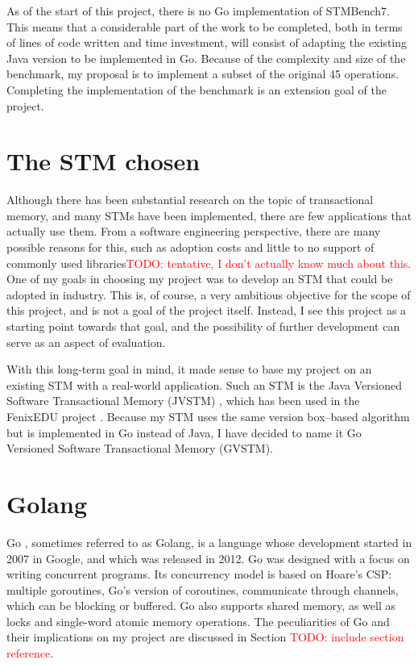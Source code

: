 \documentclass[12pt,a4paper,twoside,openright]{report}
\newcommand{\todo}[1]{\textcolor{red}{TODO: #1}}
\begin{document}
As of the start of this project, there is no Go implementation of
STMBench7. This means that a considerable part of the work to be
completed, both in terms of lines of code written and time investment,
will consist of adapting the existing Java version to be implemented
in Go. Because of the complexity and size of the benchmark, my
proposal is to implement a subset of the original 45
operations. Completing the implementation of the benchmark is an
extension goal of the project.

\section{The STM chosen}
\label{sec:stm-chosen}

Although there has been substantial research on the topic of
transactional memory, and many STMs have been implemented, there are
few applications that actually use them. From a software engineering
perspective, there are many possible reasons for this, such as
adoption costs and little to no support of commonly used
libraries\todo{tentative, I don't actually know much about this}. One
of my goals in choosing my project was to develop an STM that could be
adopted in industry. This is, of course, a very ambitious objective
for the scope of this project, and is not a goal of the project
itself. Instead, I see this project as a starting point towards that
goal, and the possibility of further development can serve as an
aspect of evaluation.

With this long-term goal in mind, it made sense to base my project on
an existing STM with a real-world application. Such an STM is the Java
Versioned Software Transactional Memory (JVSTM) \cite{jvstm}, which
has been used in the FenixEDU project
\cite{carvalho2008versioned}. Because my STM uses the same version
box--based algorithm \cite{VBox} but is implemented in Go instead of
Java, I have decided to name it Go Versioned Software Transactional
Memory (GVSTM).

\section{Golang}
\label{sec:golang}

Go \cite{Go}, sometimes referred to as Golang, is a language whose
development started in 2007 in Google, and which was released in
2012. Go was designed with a focus on writing concurrent programs. Its
concurrency model is based on Hoare's CSP: multiple goroutines, Go's
version of coroutines, communicate through channels, which can be
blocking or buffered. Go also supports shared memory, as well as locks
and single-word atomic memory operations. The peculiarities of Go and
their implications on my project are discussed in Section
\todo{include section reference}.
\end{document}
